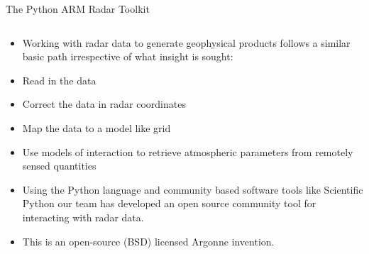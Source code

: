 \documentclass[final]{beamer}
\begin{document}
\begin{frame}{}
\begin{columns}[t]
\begin{column}{.3\linewidth}
         
        \begin{block}{The Python ARM Radar Toolkit}
                \begin{columns}[t]
                    \begin{column}{.6\linewidth}
                        \begin{itemize}
                            \item Working with radar data to generate geophysical products follows a similar basic path irrespective of what insight is sought:
			   \item Read in the data
                            \item  Correct the data in radar coordinates
                            \item  Map the data to a model like grid
                            \item  Use models of interaction to retrieve atmospheric parameters from remotely sensed quantities
                            \item  Using the Python language and community based software tools like Scientific 
                            Python our team has developed an open source community tool for interacting with radar data. 
                            \item  This is an open-source (BSD) licensed Argonne invention.
                       \end{itemize}
                   \end{column}
\end{columns}
\end{block}
\end{column}
\end{columns}
\end{frame}
\end{document}
